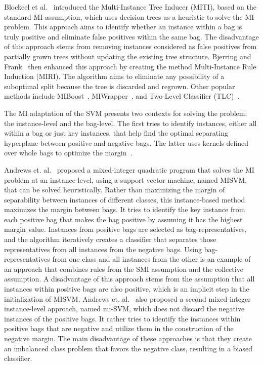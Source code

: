 \documentclass[reqno]{vcuthesis}
\numberwithin{equation}{chapter}
\begin{document}
Blockeel et al.~\cite{Blockeel2005} introduced the Multi-Instance Tree Inducer (MITI), based on the standard MI assumption, which uses decision trees as a heuristic to solve the MI problem. This approach aims to identify whether an instance within a bag is truly positive and eliminate false positives within the same bag. The disadvantage of this approach stems from removing instances considered as false positives from partially grown trees without updating the existing tree structure. Bjerring and Frank~\cite{Bjerring2011} then enhanced this approach by creating the method Multi-Instance Rule Induction (MIRI). The algorithm aims to eliminate any possibility of a suboptimal split because the tree is discarded and regrown. Other popular methods include MIBoost~\cite{Hall2009}, MIWrapper~\cite{Frank2003}, and Two-Level Classifier (TLC)~\cite{Wang2014}.

The MI adaptation of the SVM presents two contexts for solving the problem: the instance-level and the bag-level. The first tries to identify instances, either all within a bag or just key instances, that help find the optimal separating hyperplane between positive and negative bags. The latter uses kernels defined over whole bags to optimize the margin~\cite{Doran201479}. 

Andrews et. al.~\cite{Andrews2002} proposed a mixed-integer quadratic program that solves the MI problem at an instance-level, using a support vector machine, named MISVM, that can be solved heuristically. Rather than maximizing the margin of separability between instances of different classes, this instance-based method maximizes the margin between bags. It tries to identify the key instance from each positive bag that makes the bag positive by assuming it has the highest margin value. Instances from positive bags are selected as bag-representatives, and the algorithm iteratively creates a classifier that separates those representatives from all instances from the negative bags. Using bag-representatives from one class and all instances from the other is an example of an approach that combines rules from the SMI assumption and the collective assumption. A disadvantage of this approach stems from the assumption that all instances within positive bags are also positive, which is an implicit step in the initialization of MISVM. Andrews et. al.~\cite{Andrews2002} also proposed a second mixed-integer instance-level approach, named mi-SVM, which does not discard the negative instances of the positive bags. It rather tries to identify the instances within positive bags that are negative and utilize them in the construction of the negative margin. The main disadvantage of these approaches is that they create an imbalanced class problem that favors the negative class, resulting in a biased classifier.
\end{document}

